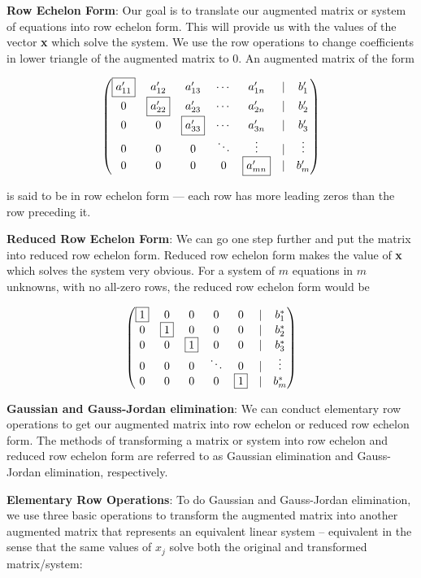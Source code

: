 \documentclass[]{book}
\theoremstyle{definition}
\theoremstyle{definition}
\theoremstyle{definition}
\theoremstyle{remark}
\begin{document}
\textbf{Row Echelon Form}: Our goal is to translate our augmented matrix
or system of equations into row echelon form. This will provide us with
the values of the vector \textbf{x} which solve the system. We use the
row operations to change coefficients in lower triangle of the augmented
matrix to 0. An augmented matrix of the form

\[\begin{pmatrix}
            \fbox{$a'_{11}$}& a'_{12} & a'_{13}& \cdots & a'_{1n} & | & b'_1\\
            0 & \fbox{$a'_{22}$} & a'_{23}& \cdots & a'_{2n} & | & b'_2\\
            0 & 0 & \fbox{$a'_{33}$}& \cdots & a'_{3n} & | & b'_3\\
            0 & 0 &0 & \ddots & \vdots  & | & \vdots \\
            0 & 0 &0 &0 & \fbox{$a'_{mn}$} & | & b'_m
            \end{pmatrix}\]

is said to be in row echelon form --- each row has more leading zeros
than the row preceding it.

\textbf{Reduced Row Echelon Form}: We can go one step further and put
the matrix into reduced row echelon form. Reduced row echelon form makes
the value of \textbf{x} which solves the system very obvious. For a
system of \(m\) equations in \(m\) unknowns, with no all-zero rows, the
reduced row echelon form would be

\[\begin{pmatrix}
            \fbox{$1$}  &  0 &   0 &    0  &   0 & | & b^*_1\\
            0  &  \fbox{$1$} &   0 &    0  &   0 & | & b^*_2\\
            0  &  0 &   \fbox{$1$} &    0  &   0 & | & b^*_3\\
            0  &  0 &   0 &\ddots &   0 & | &\vdots\\
            0  &  0 &   0 &    0  &   \fbox{$1$} & | & b^*_m
            \end{pmatrix}\]

\textbf{Gaussian and Gauss-Jordan elimination}: We can conduct
elementary row operations to get our augmented matrix into row echelon
or reduced row echelon form. The methods of transforming a matrix or
system into row echelon and reduced row echelon form are referred to as
Gaussian elimination and Gauss-Jordan elimination, respectively.

\textbf{Elementary Row Operations}: To do Gaussian and Gauss-Jordan
elimination, we use three basic operations to transform the augmented
matrix into another augmented matrix that represents an equivalent
linear system -- equivalent in the sense that the same values of \(x_j\)
solve both the original and transformed matrix/system:
\end{document}
